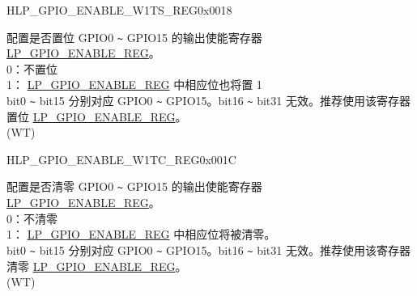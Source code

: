 \begin{register}{H}{LP\_GPIO\_ENABLE\_W1TS\_REG}{0x0018}\label{regdesc:LPGPIOENABLEW1TSREG}
%
%
\regnewline%
\begin{regdesc}\begin{reglist}
\label{fielddesc:LPGPIOENABLEDATAW1TS}\item [LP\_GPIO\_ENABLE\_DATA\_W1TS] 配置是否置位 GPIO0 \verb+~+ GPIO15 的输出使能寄存器 \hyperref[regdesc:LPGPIOENABLEREG]{LP\_GPIO\_ENABLE\_REG}。\\
0：不置位\\
1： \hyperref[regdesc:LPGPIOENABLEREG]{LP\_GPIO\_ENABLE\_REG} 中相应位也将置 1 \\
bit0 \verb+~+ bit15 分别对应 GPIO0 \verb+~+ GPIO15。bit16 \verb+~+ bit31 无效。推荐使用该寄存器置位 \hyperref[regdesc:LPGPIOENABLEREG]{LP\_GPIO\_ENABLE\_REG}。\\
(WT)
\end{reglist}\end{regdesc}
\end{register}


\begin{register}{H}{LP\_GPIO\_ENABLE\_W1TC\_REG}{0x001C}\label{regdesc:LPGPIOENABLEW1TCREG}
%
%
\regnewline%
\begin{regdesc}\begin{reglist}
\label{fielddesc:LPGPIOENABLEDATAW1TC}\item [LP\_GPIO\_ENABLE\_DATA\_W1TC] 配置是否清零 GPIO0 \verb+~+ GPIO15 的输出使能寄存器  \hyperref[regdesc:LPGPIOENABLEREG]{LP\_GPIO\_ENABLE\_REG}。\\
0：不清零 \\
 1： \hyperref[regdesc:LPGPIOENABLEREG]{LP\_GPIO\_ENABLE\_REG} 中相应位将被清零。 \\
bit0 \verb+~+ bit15 分别对应 GPIO0 \verb+~+ GPIO15。bit16 \verb+~+ bit31 无效。推荐使用该寄存器清零 \hyperref[regdesc:LPGPIOENABLEREG]{LP\_GPIO\_ENABLE\_REG}。\\
(WT)
\end{reglist}\end{regdesc}
\end{register}


